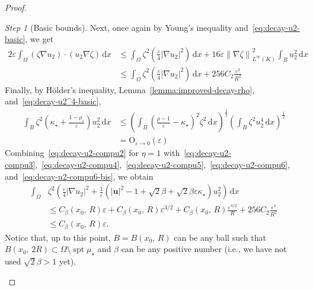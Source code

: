 \documentclass[a4paper, 11pt, twoside, leqno]{article}
\theoremstyle{definition}              %
\theoremstyle{remark}                  %
\newtheorem{step}{Step}
\DeclareMathOperator{\spt}{spt}                                     %
\newcommand{\abs}[1]{\left| #1 \right|}                             %
\newcommand{\norm}[1]{\left\| #1 \right\|}                          %
\renewcommand{\d}{\mathrm{d}}
\renewcommand{\u}{\mathbf{u}}
\newcommand{\eps}{\varepsilon}
\begin{document}
\begin{proof}
\begin{step}[Basic bounds]
    Next, once again by Young's inequality 
    and~\eqref{eq:decay-u2-basic}, we get 
    \begin{equation}\label{eq:decay-u2-compu6}
    \begin{split}
        2 \eps \int_\Omega\left( \zeta \nabla u_2 \right) \cdot \left( u_2 \nabla \zeta \right) \,{\d}x 
        &\leq \int_\Omega \zeta^2 \left( \frac{\eps}{4} \abs{\nabla u_2}^2 \right) \,{\d}x + 16 \eps\norm{\nabla \zeta}_{L^\infty(K)}^2 \int_B u_2^2\,{\d}x \\
        &\leq \int_\Omega \zeta^2 \left( \frac{\eps}{4} \abs{\nabla u_2}^2 \right) \,{\d}x + 256 C_2 \frac{\eps^2}{R^2}
    \end{split}
    \end{equation}
    Finally, by H\"{o}lder's inequality, Lemma~\ref{lemma:improved-decay-rho}, 
    and~\eqref{eq:decay-u2^4-basic}, 
    \begin{equation}\label{eq:decay-u2-compu6-bis}
    \begin{split}
   	 	\int_B \zeta^2 \left(\kappa_\star + \frac{1 -\rho_\eps}{\eps} \right) u_2^2\,{\d}x 
   	 	&\leq \left( \int_B \left( \frac{\rho - 1}{\eps} - \kappa_\star \right)^2 \zeta^2 \,{\d}x \right)^\frac{1}{2} 
   	 	\left( \int_B \zeta^2 u_2^4 \,{\d}x \right)^\frac{1}{2} \\
   	 	&= \mathrm{O}_{\eps \to 0}(\eps)
   	\end{split}
    \end{equation}
    Combining~\eqref{eq:decay-u2-compu2} for $\eta=1$ with~\eqref{eq:decay-u2-compu3},~\eqref{eq:decay-u2-compu4},~\eqref{eq:decay-u2-compu5},~\eqref{eq:decay-u2-compu6}, and~\eqref{eq:decay-u2-compu6-bis}, 
    we obtain
    \begin{equation}\label{eq:decay-u2-step-1}
    \begin{split}
     \int_\Omega &\zeta^2 \left( \frac{\eps}{4} \abs{\nabla u_2}^2 + \frac{1}{\eps}\left( \abs{\u}^2 - 1 + \sqrt{2}\beta + \sqrt{2}\beta \eps \kappa_\star \right) u_2^2 \right)\,{\d}x   \\
     &\leq C_\beta(x_0,\,R) \eps + C_{\beta}(x_0,\,R) \eps^{3/2} + C_\beta(x_0,\,R) \frac{\eps^{3/2}}{R} + 256 C_2 \frac{\eps^2}{R^2} \\
     &\leq C_\beta(x_0,\,R) \eps.
    \end{split}
    \end{equation}
Notice that, up to this point, $B = B(x_0,\,R)$ can be any ball such that    
$B(x_0,\,2R) \subset \Omega \setminus \spt \mu_\star$ and $\beta$ can be any positive number 
(i.e., we have not used $\sqrt{2}{\beta} > 1$ yet). 
\end{step}


\end{proof}
\end{document}
